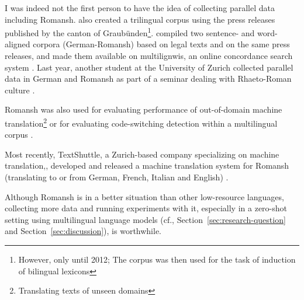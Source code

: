 I was indeed not the first person to have the idea of collecting parallel data including Romansh. 
\cite{scherrer-cartoni-2012-trilingual} also created a trilingual corpus using the press releases published by the canton of Graubünden\footnote{However, only until 2012; The corpus was then used for the task of induction of bilingual lexicons}. 
\cite{weibel-2014} compiled two sentence- and word-aligned corpora (German-Romansh) based on legal texts and on the same press releases, and made them available on multilignwis, an online concordance search system \autocite{multilingwis}. 
Last year, another student at the University of Zurich collected parallel data in German and Romansh as part of a seminar dealing with Rhaeto-Roman culture \autocite{gasner-2021}.

Romansh was also used for evaluating performance of out-of-domain machine translation\footnote{Translating texts of unseen domains} \autocite{muller-etal-2020-domain} or for evaluating code-switching detection within a multilingual corpus \autocite{volk-clematide-2014-detecting}.

Most recently, TextShuttle, a Zurich-based company specializing on machine translation,, developed and released a machine translation system for Romansh (translating to or from German, French, Italian and English) \autocite{textshuttle}.

Although Romansh is in a better situation than other low-resource languages, collecting more data and running experiments with it, especially in a zero-shot setting using multilingual language models (cf., Section~\ref{sec:research-question} and Section~\ref{sec:discussion}), is worthwhile.

